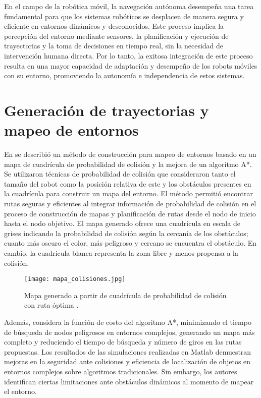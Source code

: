 En el campo de la robótica móvil, la navegación autónoma desempeña una tarea fundamental para que los sistemas robóticos se desplacen de manera segura y eficiente en entornos dinámicos y desconocidos. Este proceso implica la percepción del entorno mediante sensores, la planificación y ejecución de trayectorias y la toma de decisiones en tiempo real, sin la necesidad de intervención humana directa. Por lo tanto, la exitosa integración de este proceso resulta en una mayor capacidad de adaptación y desempeño de los robots móviles con su entorno, promoviendo la autonomía e independencia de estos sistemas.

\section{Generación de trayectorias y mapeo de entornos}
En \cite{li_map_2023} se describió un método de construcción para mapeo de entornos basado en un mapa de cuadrícula de probabilidad de colisión y la mejora de un algoritmo A*. Se utilizaron técnicas de probabilidad de colisión que consideraron tanto el tamaño del robot como la posición relativa de este y los obstáculos presentes en la cuadrícula para construir un mapa del entorno. El método permitió encontrar rutas seguras y eficientes al integrar información de probabilidad de colisión en el proceso de construcción de mapas y planificación de rutas desde el nodo de inicio hasta el nodo objetivo. El mapa generado ofrece una cuadrícula en escala de grises indicando la probabilidad de colisión según la cercanía de los obstáculos; cuanto más oscuro el color, más peligroso y cercano se encuentra el obstáculo. En cambio, la cuadrícula blanca representa la zona libre y menos propensa a la colisión.

\begin{figure}[H]
	\centering
	\texttt{[image: mapa\_colisiones.jpg]}
	\caption{Mapa generado a partir de cuadrícula de probabilidad de colisión con ruta óptima \cite{li_map_2023}.}
	\label{fig2_1}
\end{figure}

Además, considera la función de costo del algoritmo A*, minimizando el tiempo de búsqueda de nodos peligrosos en entornos complejos, generando un mapa más completo y reduciendo el tiempo de búsqueda y número de giros en las rutas propuestas. Los resultados de las simulaciones realizadas en Matlab demuestran mejoras en la seguridad ante colisiones y eficiencia de localización de objetos en entornos complejos sobre algoritmos tradicionales. Sin embargo, los autores identifican ciertas limitaciones ante obstáculos dinámicos al momento de mapear el entorno.\\

